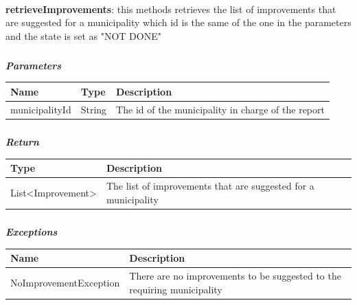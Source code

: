 					\paragraph{}
							\textbf{retrieveImprovements}: this methods retrieves the list of improvements that are suggested for a municipality which id is the same of the one in the parameters  and the state is set as "NOT DONE"
							\subparagraph{}
							\vspace{-3mm}
							\textit{\textbf{Parameters}}
								\begin{table}[!h]
									\begin{tabular}{L{0.2\textwidth}L{0.15\textwidth}L{0.45\textwidth}}
										\toprule
										\textbf{Name} & \textbf{Type} & \textbf{Description} \\
										\midrule
								  		municipalityId & String & The id of the municipality in charge of the report \\
								 		\bottomrule
									\end{tabular}
								\end{table}
							\subparagraph{}
							\vspace{-6mm}
								\textit{\textbf{Return}}
								\vspace{-2mm}
									\begin{table}[!h]
									\begin{tabular}{L{0.3\textwidth}L{0.5\textwidth}}
										\toprule
										\textbf{Type} & \textbf{Description} \\
										\midrule
								  		List<Improvement> & The list of improvements that are suggested for a municipality \\
								 		\bottomrule
									\end{tabular}
								\end{table}
							\clearpage
							\subparagraph{}
								\textit{\textbf{Exceptions}}
								\vspace{-2mm}
									\begin{table}[!h]
									\begin{tabular}{ll}
										\toprule
										\textbf{Name} & \textbf{Description} \\
										\midrule
								  		NoImprovementException & There are no improvements to be suggested to the requiring municipality \\ 
								 		\bottomrule
									\end{tabular}
								\end{table}
								
